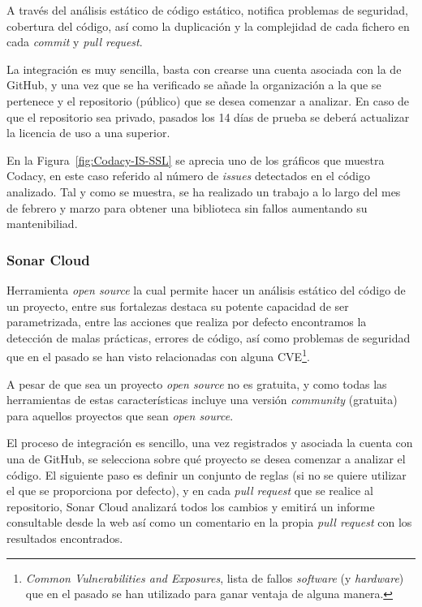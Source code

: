 A través del análisis estático de código estático, notifica problemas de seguridad, cobertura del código, así como la duplicación y la complejidad de cada fichero en cada \textit{commit} y \textit{pull request}.

La integración es muy sencilla, basta con crearse una cuenta asociada con la de GitHub, y una vez que se ha verificado se añade la organización a la que se pertenece y el repositorio (público) que se desea comenzar a analizar. En caso de que el repositorio sea privado, pasados los 14 días de prueba se deberá actualizar la licencia de uso a una superior.


En la Figura~\ref{fig:Codacy-IS-SSL} se aprecia uno de los gráficos que muestra Codacy, en este caso referido al número de \textit{issues} detectados en el código analizado. Tal y como se muestra, se ha realizado un trabajo a lo largo del mes de febrero y marzo para obtener una biblioteca sin fallos aumentando su mantenibiliad.

\subsubsection{Sonar Cloud}

Herramienta \textit{open source} la cual permite hacer un análisis estático del código de un proyecto, entre sus fortalezas destaca su potente capacidad de ser parametrizada, entre las acciones que realiza por defecto encontramos la detección de malas prácticas, errores de código, así como problemas de seguridad que en el pasado se han visto relacionadas con alguna CVE\footnote{\textit{Common Vulnerabilities and Exposures}, lista de fallos \textit{software} (y \textit{hardware}) que en el pasado se han utilizado para ganar ventaja de alguna manera.}.

A pesar de que sea un proyecto \textit{open source} no es gratuita, y como todas las herramientas de estas características incluye una versión \textit{community} (gratuita) para aquellos proyectos que sean \textit{open source}.

El proceso de integración es sencillo, una vez registrados y asociada la cuenta con una de GitHub, se selecciona sobre qué proyecto se desea comenzar a analizar el código. El siguiente paso es definir un conjunto de reglas (si no se quiere utilizar el que se proporciona por defecto), y en cada \textit{pull request} que se realice al repositorio, Sonar Cloud analizará todos los cambios y emitirá un informe consultable desde la web así como un comentario en la propia \textit{pull request} con los resultados encontrados.

